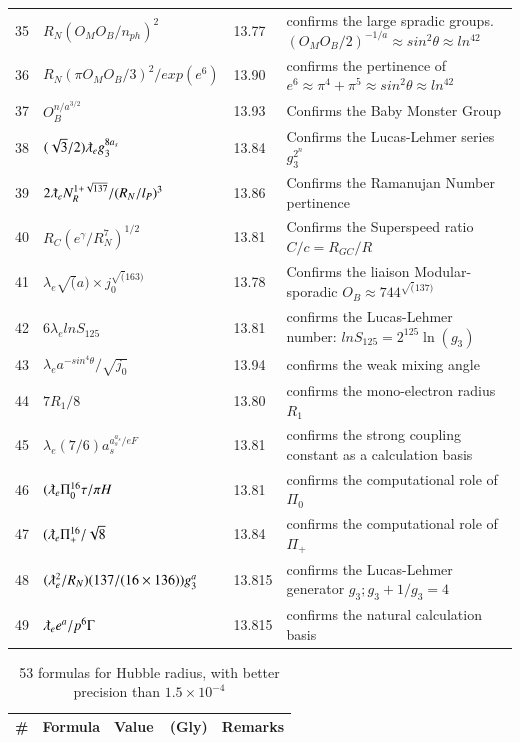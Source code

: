 \documentclass[a4paper,9pt]{article}
\begin{document}
\begin{appendix}
\begin{table}
\begin{tabular}{llll}
    35& $R_N (O_M O_B/n_{ph})^2$ & 13.77 & confirms the large spradic groups. $(O_M O_B/2)^{-1/a} \approx sin^2\theta \approx ln^42$ \\
    36 & $R_N (\pi O_M O_B/3)^2 / exp(e^6)$ & 13.90 & confirms the pertinence of $e^6 \approx \pi^4 + \pi^5  \approx sin^2\theta \approx ln^42$ \\
    37 & $O_B^{n/ a^{3/2}}$ & 13.93 & Confirms the Baby Monster Group \\
    38 & $(\sqrt{3}/2)\lambdabar_{e}g_3^{8a_s}$ & 13.84 & Confirms the Lucas-Lehmer series $g_ 3^{2^n}$ \\
    39 & $2\lambdabar_{e} N_R^{1+\sqrt{137}}/(R_N/l_P)^3$ & 13.86 & Confirms the Ramanujan Number pertinence \\
    40 & $R_{C} (e^\gamma/R_N^7)^{1/2}$ & 13.81 & Confirms the Superspeed ratio $C/c = R_{GC}/R$\\
    41 & $\lambda_{e} \sqrt(a) \times j_0 ^{\sqrt(163)}$   & 13.78 & Confirms the  liaison Modular-sporadic $O_B \approx 744^{ \sqrt(137)}$ \\ 
    42 & $ 6\lambda_{e} lnS_{125} $   & 13.81 & confirms the Lucas-Lehmer number: $lnS_{125}  = 2^{125} \ln(g_3) $ \\
    43 & $ \lambda_{e} a^{-sin^4\theta}/\sqrt {j_0}  $   & 13.94 & confirms the weak mixing angle \\ 
    44 & $7R_1/8  $   & 13.80 & confirms the mono-electron radius $R_1$ \\ 
    45 & $ \lambda_{e} (7/6) a_s^{a_s^{a_s}/eF}  $   & 13.81 & confirms the strong coupling constant as a calculation basis \\    
    46 & $(\lambdabar_{e} \Pi_0^{16} \tau/\pi H $ & 13.81 & confirms the computational role of $\Pi_0$ \\    
    47 & $(\lambdabar_{e} \Pi_+^{16} /\sqrt 8 $ & 13.84 & confirms the computational role of $\Pi_+$ \\    
    48 & $(\lambdabar_{e}^2/R_N) (137/(16 \times 136)) g_3^a$ & 13.815 & confirms the Lucas-Lehmer generator $g_3 ; g_3 +1/g_3 = 4$ \\
    49 & $\lambdabar_{e} e^a/p^6\Gamma $ & 13.815 & confirms the natural calculation basis \\
   

    \bottomrule
  \end{tabular}
\end{table}


\begin{table}
\caption{53 formulas for Hubble radius, with better precision than $1.5 \times 10^{-4}$}
\label{tab:5:table5}
  \hskip-2.0cm\begin{tabular}{llll}
    \toprule
    \cmidrule(r){1-4}
   \#     & Formula     & Value~~(Gly) & Remarks \\
    \midrule    
    

\end{tabular}
\end{table}
\end{appendix}
\end{document}
